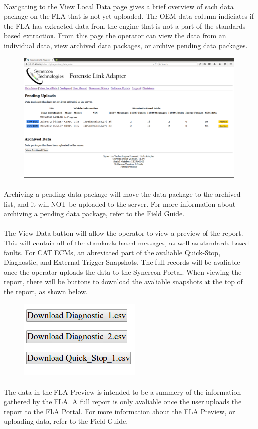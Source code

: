 \documentclass[11pt]{article}
\begin{document}
\paragraph{  }
Navigating to the View Local Data page gives a brief overview of each data package on the FLA that is not yet uploaded. The OEM data column indiciates if the FLA has extracted data from the engine that is not a part of the standards-based extraction. From this page the operator can view the data from an individual data, view archived data packages, or archive pending data packages.
\begin{figure}[tbph]
\centering
\includegraphics[width=.95\linewidth]{../../media/fla_preview_screenshots/local_data}
\label{fig:fla_preview_local_data}
\end{figure}
\paragraph{  }
Archiving a pending data package will move the data package to the archived list, and it will NOT be uploaded to the server. For more information about archiving a pending data package, refer to the Field Guide.
\paragraph{  }
The View Data button will allow the operator to view a preview of the report. This will contain all of the standards-based messages, as well as standards-based faults. For CAT ECMs, an abreviated part of the avaliable Quick-Stop, Diagnostic, and External Trigger Snapshots. The full records will be avaliable once the operator uploads the data to the Synercon Portal. When viewing the report, there will be buttons to download the avaliable snapshots at the top of the report, as shown below.
\begin{figure}[tbph]
\centering
\includegraphics[width=.3\linewidth]{../../media/fla_preview_screenshots/csv_download}
\end{figure}

\paragraph{  }
The data in the FLA Preview is intended to be a summery of the information gathered by the FLA. A full report is only avaliable once the user uploads the report to the FLA Portal. For more information about the FLA Preview, or uploading data, refer to the Field Guide.
\end{document}
